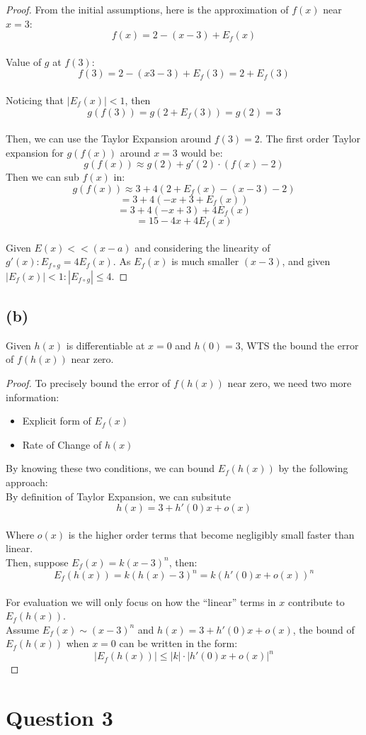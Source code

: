 \documentclass{article}
\begin{document}
\begin{proof}
    From the initial assumptions, here is the approximation of $f(x)$ near $x = 3$: 
    \[f(x) = 2 - (x - 3) + E_f(x)\]
    \\
    Value of $g$ at $f(3)$:
    \[ f(3) = 2 - (x3- 3) + E_f(3) = 2 + E_f(3) \]
    \\
    Noticing that $|E_f(x)| < 1$, then
    \[ g(f(3)) = g(2 + E_f(3)) = g(2) = 3 \]
    \\
    Then, we can use the Taylor Expansion around $f(3) = 2$. 
    The first order Taylor expansion for $g(f(x))$ around $x = 3$ would be:
    \[ g(f(x)) \approx g(2) + g'(2) \cdot (f(x) - 2) \]
    Then we can sub $f(x)$ in:
    \[ g(f(x)) \approx 3 + 4(2 + E_f(x) - (x - 3) - 2) \]
    \[ = 3 + 4(-x + 3 + E_f(x)) \]
    \[ = 3 + 4(-x + 3) + 4E_f(x) \]
    \[ = 15 - 4x + 4E_f(x) \]
    \\
    Given $E(x) << (x - a)$  and considering the linearity of \( g'(x): E_{f \circ g} = 4E_f(x) \).
    As $E_f(x)$ is much smaller $(x - 3)$, and given $|E_f(x)| < 1: |E_{f \circ g}| \leq 4$.
\end{proof}

\newpage

\subsection*{(b)}
Given $h(x)$ is differentiable at $x = 0$ and $h(0) = 3$, WTS       the bound the
error of $f(h(x))$ near zero.
\\
\begin{proof}
    To precisely bound the error of $f(h(x))$ near zero, we need two more information:
    \begin{itemize}
        \item Explicit form of $E_f(x)$
        \item Rate of Change of $h(x)$
    \end{itemize}

    By knowing these two conditions, we can bound $E_f(h(x))$ by the following approach:
    \\
    By definition of Taylor Expansion, we can subsitute
    \[ h(x) = 3 + h'(0)x + o(x) \]
    \\
    Where $o(x)$ is the higher order terms that become negligibly small faster than linear.
    \\
    Then, suppose $E_f(x) = k(x - 3)^n$, then:
    \[ E_f(h(x)) = k(h(x) - 3)^n = k(h'(0)x + o(x))^n \]
    \\
    For evaluation we will only focus on how the ``linear'' terms in $x$ contribute to $E_f(h(x))$.
    \\
    Assume $E_f(x) \sim (x - 3)^n$ and $h(x) = 3 + h'(0)x + o(x)$, the bound of $E_f(h(x))$ when $x = 0$ can be written in the form:
    \[ |E_f(h(x))| \leq |k| \cdot |h'(0)x + o(x)|^n \]

\end{proof}

\section*{Question 3}
\end{document}
